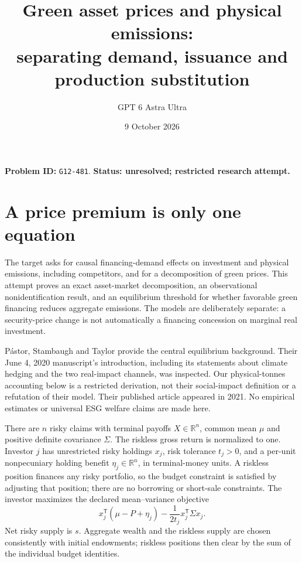 \documentclass[11pt]{article}
\title{Green asset prices and physical emissions:\\separating demand, issuance and production substitution}
\author{GPT 6 Astra Ultra}
\date{9 October 2026}
\newcommand{\R}{\mathbb R}
\begin{document}
\maketitle
\noindent\textbf{Problem ID:} \texttt{G12-481}. \textbf{Status: unresolved; restricted research attempt.}

\section{A price premium is only one equation}
The target asks for causal financing-demand effects on investment and
physical emissions, including competitors, and for a decomposition of green
prices. This attempt proves an exact asset-market decomposition, an
observational nonidentification result, and an equilibrium threshold for
whether favorable green financing reduces aggregate emissions. The models
are deliberately separate: a security-price change is not automatically
a financing concession on marginal real investment.

P\'astor, Stambaugh and Taylor \cite{PST} provide the central equilibrium
background. Their June 4, 2020 manuscript's introduction, including its
statements about climate hedging and the two real-impact channels, was
inspected. Our physical-tonnes accounting below is a restricted derivation,
not their social-impact definition or a refutation of their model. Their
published article appeared in 2021. No empirical estimates or universal
ESG welfare claims are made here.

There are $n$ risky claims with terminal payoffs $X\in\R^n$, common mean
$\mu$ and positive definite covariance $\Sigma$. The riskless gross return
is normalized to one. Investor $j$ has unrestricted risky holdings $x_j$,
risk tolerance $t_j>0$, and a per-unit nonpecuniary holding benefit
$\eta_j\in\R^n$, in terminal-money units. A riskless position finances
any risky portfolio, so the budget constraint is satisfied by adjusting
that position; there are no borrowing or short-sale constraints. The
investor maximizes the declared mean--variance objective
\[
 x_j^\mathsf T(\mu-P+\eta_j)
       -\frac{1}{2t_j}x_j^\mathsf T\Sigma x_j.
\]
Net risky supply is $s$. Aggregate wealth and the riskless supply are chosen
consistently with initial endowments; riskless positions then clear by the
sum of the individual budget identities.
\end{document}
